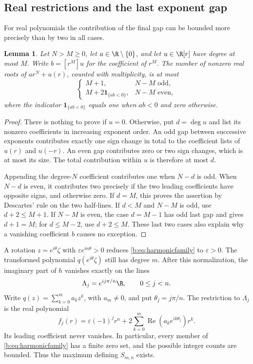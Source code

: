 \documentclass[UTF8,11pt]{ctexart}
\newtheorem{lem}[thm]{Lemma}
\theoremstyle{definition}
\numberwithin{equation}{section}
\DeclareMathOperator{\Rea}{Re}\DeclareMathOperator{\Ima}{Im}
\begin{document}
\subsection{Real restrictions and the last exponent gap}
For real polynomials the contribution of the final gap can be
bounded more precisely than by two in all cases.
\begin{lem}\label{b:lem:harmonicgap}
Let $N>M\ge0$, let $a\in\R\setminus\{0\}$, and let
$u\in\R[r]$ have degree at most $M$. Write $b=[r^M]u$ for the
coefficient of $r^M$. The number of nonzero real roots of
$ar^N+u(r)$, counted with multiplicity, is at most
\[
 \begin{cases}
  M+1,&N-M\text{ odd},\\
  M+2\mathbf1_{\{ab<0\}},&N-M\text{ even},
 \end{cases}
\]
where the indicator $\mathbf1_{\{ab<0\}}$ equals one when $ab<0$
and zero otherwise.
\end{lem}
\begin{proof}
There is nothing to prove if $u=0$. Otherwise, put $d=\deg u$ and
list its nonzero coefficients in increasing exponent order.
An odd gap between successive exponents contributes exactly one
sign change in total to the coefficient lists of $u(r)$ and
$u(-r)$. An even gap contributes zero or two sign changes, which
is at most its size. The total contribution within $u$ is
therefore at most $d$.

Appending the degree-$N$ coefficient contributes one when $N-d$
is odd. When $N-d$ is even, it contributes two precisely if the
two leading coefficients have opposite signs, and otherwise zero.
If $d=M$, this proves the assertion by Descartes' rule on the two
half-lines. If $d<M$ and $N-M$ is odd, use $d+2\le M+1$.
If $N-M$ is even, the case $d=M-1$ has odd last gap and gives
$d+1=M$; for $d\le M-2$, use $d+2\le M$. These last two cases
also explain why a vanishing coefficient $b$ causes no exception.
\end{proof}

A rotation $z=e^{i\theta}\zeta$ with
$\varepsilon e^{in\theta}>0$ reduces \eqref{b:eq:harmonicfamily} to
$\varepsilon>0$. The transformed polynomial $q(e^{i\theta}\zeta)$
still has degree $m$. After this normalization, the imaginary part
of $h$ vanishes exactly on the lines
\begin{equation}\label{b:eq:harmoniclines}
 \Lambda_j=e^{ij\pi/n}\R,\qquad 0\le j<n.
\end{equation}
Write $q(z)=\sum_{k=0}^m a_kz^k$, with $a_m\ne0$, and put
$\theta_j=j\pi/n$. The restriction to $\Lambda_j$ is the real
polynomial
\begin{equation}\label{b:eq:harmonicrestriction}
 f_j(r)=\varepsilon(-1)^jr^n+
             2\sum_{k=0}^m\Rea(a_ke^{ik\theta_j})r^k.
\end{equation}
Its leading coefficient never vanishes. In particular, every member
of \eqref{b:eq:harmonicfamily} has a finite zero set, and the possible
integer counts are bounded. Thus the maximum defining $S_{m,n}$
exists.
\end{document}
